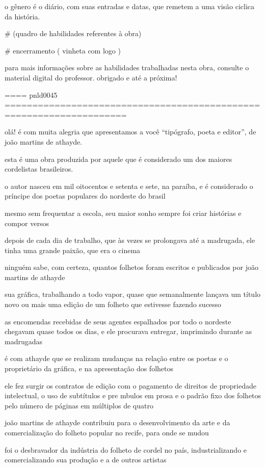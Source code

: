 o gênero é o diário, com suas entradas e datas, que remetem a uma visão ciclica da história.


# (quadro de habilidades referentes à obra)

# encerramento ( vinheta com logo )

para mais informações sobre as habilidades trabalhadas nesta obra, consulte o material digital do professor. obrigado e até a próxima!


==== pnld0045 ====================================================================

olá! é com muita alegria que apresentamos a você “tipógrafo, poeta e editor”, de joão martins de athayde.

esta é uma obra produzida por aquele que é considerado um dos maiores cordelistas brasileiros.

o autor nasceu em mil oitocentos e setenta e sete, na paraíba,  e é considerado  o príncipe dos poetas populares do nordeste do brasil  

mesmo sem frequentar a escola,  seu maior sonho sempre foi criar histórias e compor versos

depois de cada dia de trabalho, que às vezes se prolongava até a madrugada, ele tinha uma grande paixão, que era o cinema 

ninguém sabe, com certeza, quantos folhetos foram escritos e publicados por joão martins de athayde

sua gráfica, trabalhando a todo vapor, quase que semanalmente lançava um título novo ou mais uma edição de um folheto que estivesse fazendo sucesso

as encomendas recebidas de seus agentes espalhados por todo o nordeste chegavam quase todos os dias, e ele procurava entregar, imprimindo durante as madrugadas

é com athayde que se realizam mudanças na relação entre os poetas e o proprietário da gráfica, e na apresentação dos folhetos

ele fez surgir os contratos de edição com o pagamento de direitos de propriedade intelectual, o uso de subtítulos e pre mbulos em prosa e o padrão fixo dos folhetos pelo número de páginas em múltiplos de quatro

joão martins de athayde contribuiu para o desenvolvimento da arte e da comercialização do folheto popular no recife, para onde se mudou

foi o desbravador da indústria do folheto de cordel no país, industrializando e comercializando sua produção e a de outros artistas

